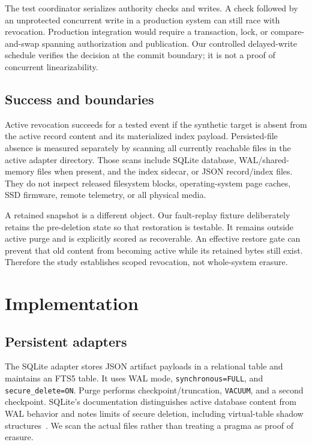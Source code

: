 ﻿\documentclass[sigconf,nonacm]{acmart}
\begin{document}
The test coordinator serializes authority checks and writes. A check followed by an unprotected concurrent write in a production system can still race with revocation. Production integration would require a transaction, lock, or compare-and-swap spanning authorization and publication. Our controlled delayed-write schedule verifies the decision at the commit boundary; it is not a proof of concurrent linearizability.

\subsection{Success and boundaries}
Active revocation succeeds for a tested event if the synthetic target is absent from the active record content and its materialized index payload. Persisted-file absence is measured separately by scanning all currently reachable files in the active adapter directory. Those scans include SQLite database, WAL/shared-memory files when present, and the index sidecar, or JSON record/index files. They do not inspect released filesystem blocks, operating-system page caches, SSD firmware, remote telemetry, or all physical media.

A retained snapshot is a different object. Our fault-replay fixture deliberately retains the pre-deletion state so that restoration is testable. It remains outside active purge and is explicitly scored as recoverable. An effective restore gate can prevent that old content from becoming active while its retained bytes still exist. Therefore the study establishes scoped revocation, not whole-system erasure.

\section{Implementation}
\subsection{Persistent adapters}
The SQLite adapter stores JSON artifact payloads in a relational table and maintains an FTS5 table. It uses WAL mode, \texttt{synchronous=FULL}, and \texttt{secure\_delete=ON}. Purge performs checkpoint/truncation, \texttt{VACUUM}, and a second checkpoint. SQLite's documentation distinguishes active database content from WAL behavior and notes limits of secure deletion, including virtual-table shadow structures~\cite{sqlitepragma,sqlitewal}. We scan the actual files rather than treating a pragma as proof of erasure.
\end{document}
